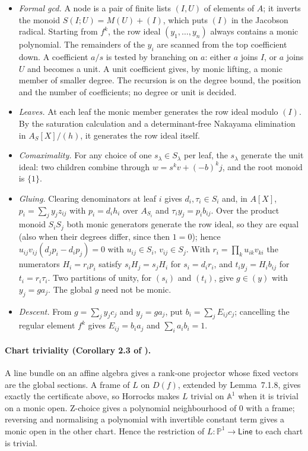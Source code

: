 \documentclass[11pt]{article}
\newcommand{\PP}{\mathbb{P}^1}
\theoremstyle{remark}
\begin{document}
\begin{itemize}
\item \emph{Formal gcd.} A node is a pair of finite lists $(I,U)$ of
  elements of $A$; it inverts the monoid $S(I;U)=M(U)+(I)$, which puts
  $(I)$ in the Jacobson radical. Starting from $f^k$, the row ideal
  $(y_1,\dots,y_n)$ always contains a monic polynomial. The remainders of
  the $y_i$ are scanned from the top coefficient down. A coefficient $a/s$
  is tested by branching on $a$: either $a$ joins $I$, or $a$ joins $U$
  and becomes a unit. A unit coefficient gives, by monic lifting, a monic
  member of smaller degree. The recursion is on the degree bound, the
  position and the number of coefficients; no degree or unit is decided.
\item \emph{Leaves.} At each leaf the monic member generates the row
  ideal modulo $(I)$. By the saturation calculation and a determinant-free
  Nakayama elimination in $A_S[X]/(h)$, it generates the row ideal itself.
\item \emph{Comaximality.} For any choice of one $s_\lambda\in S_\lambda$
  per leaf, the $s_\lambda$ generate the unit ideal: two children combine
  through $w=s^kv+(-b)^kj$, and the root monoid is $\{1\}$.
\item \emph{Gluing.} Clearing denominators at leaf $i$ gives
  $d_i,\tau_i\in S_i$ and, in $A[X]$, $p_i=\sum_jy_jz_{ij}$ with
  $p_i=d_ih_i$ over $A_{S_i}$ and $\tau_iy_j=p_ib_{ij}$. Over the product
  monoid $S_iS_j$ both monic generators generate the row ideal, so they
  are equal (also when their degrees differ, since then $1=0$); hence
  $u_{ij}v_{ij}(d_jp_i-d_ip_j)=0$ with $u_{ij}\in S_i$, $v_{ij}\in S_j$.
  With $r_i=\prod_ku_{ik}v_{ki}$ the numerators $H_i=r_ip_i$ satisfy
  $s_iH_j=s_jH_i$ for $s_i=d_ir_i$, and $t_iy_j=H_ib_{ij}$ for
  $t_i=r_i\tau_i$. Two partitions of unity, for $(s_i)$ and $(t_i)$, give
  $g\in(y)$ with $y_j=ga_j$. The global $g$ need not be monic.
\item \emph{Descent.} From $g=\sum_jy_jc_j$ and $y_j=ga_j$, put
  $b_i=\sum_jE_{ij}c_j$; cancelling the regular element $f^k$ gives
  $E_{ij}=b_ia_j$ and $\sum_ia_ib_i=1$.
\end{itemize}

\paragraph{Chart triviality (Corollary 2.3 of \cite{Proj}).} A line bundle
on an affine algebra gives a rank-one projector whose fixed vectors are
the global sections. A frame of $L$ on $D(f)$, extended by Lemma~7.1.8,
gives exactly the certificate above, so Horrocks makes $L$ trivial on
$\mathbb A^1$ when it is trivial on a monic open. Z-choice gives a
polynomial neighbourhood of $0$ with a frame; reversing and normalising a
polynomial with invertible constant term gives a monic open in the other
chart. Hence the restriction of $L:\PP\to\mathsf{Line}$ to each chart is
trivial.
\end{document}
